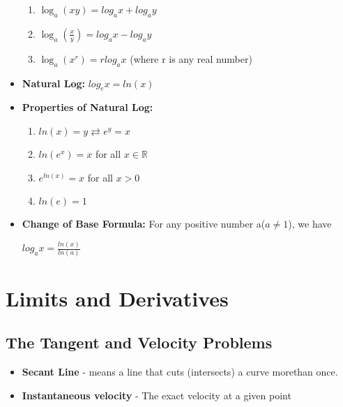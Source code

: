 \documentclass{report}
\begin{document}
\begin{itemize}
	\begin{enumerate}\addtolength{\leftskip}{4em}
	\item $\log _a(xy) = log_ax+log_ay$
	\item $\log _a(\frac{x}{y}) = log_ax-log_ay$
	\item $\log _a(x^r) = rlog_ax$ (where r is any real number)
	\end{enumerate}
	\item \textbf{Natural Log: }$log_ex=ln(x)$
	\item \textbf{Properties of Natural Log:} 
	\begin{enumerate}\addtolength{\leftskip}{4em}
		\item $ln(x)=y \rightleftarrows e^y=x$
		\item $ln(e^x)=x$ for all $x \in \mathbb{R}$
		\item $e^{ln(x)}=x$ for all $x>0$
		\item $ln(e)=1$
	\end{enumerate}
	\item\textbf{Change of Base Formula:} For any positive number a($a\ne1$), we have 
	\begin{center}
	$log_ax=\frac{ln(x)}{ln(a)}$
	\end{center}
	\end{itemize}
\chapter{Limits and Derivatives}
	\section{The Tangent and Velocity Problems}
		\begin{itemize}\addtolength{\leftskip}{2em}
				\item \textbf{Secant Line} - means a line that cuts (intersects) a curve morethan once.
				\item \textbf{Instantaneous velocity} - The exact velocity at a given point
		\end{itemize}
\end{document}
